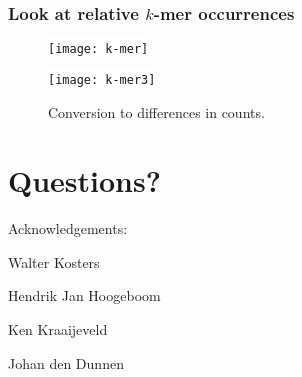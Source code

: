 \documentclass[slidestop]{beamer}
\begin{document}
\begin{frame}
  \frametitle{Look at relative $k$-mer occurrences}

  \begin{figure}
    \colorbox{white}{
      \texttt{[image: k-mer]}
    }
    \smallskip

    \colorbox{white}{
      \texttt{[image: k-mer3]}
    }
    \vspace{-0.5cm}
    \caption{Conversion to differences in counts.}
  \end{figure}
\end{frame}

\section{Questions?}
\lastpagetemplate
\begin{frame}
  \begin{center}
    Acknowledgements:
    \bigskip
    \bigskip

    Walter Kosters

    Hendrik Jan Hoogeboom

    Ken Kraaijeveld

    Johan den Dunnen
    \vspace{3.5cm}

  \end{center}
\end{frame}
\end{document}
